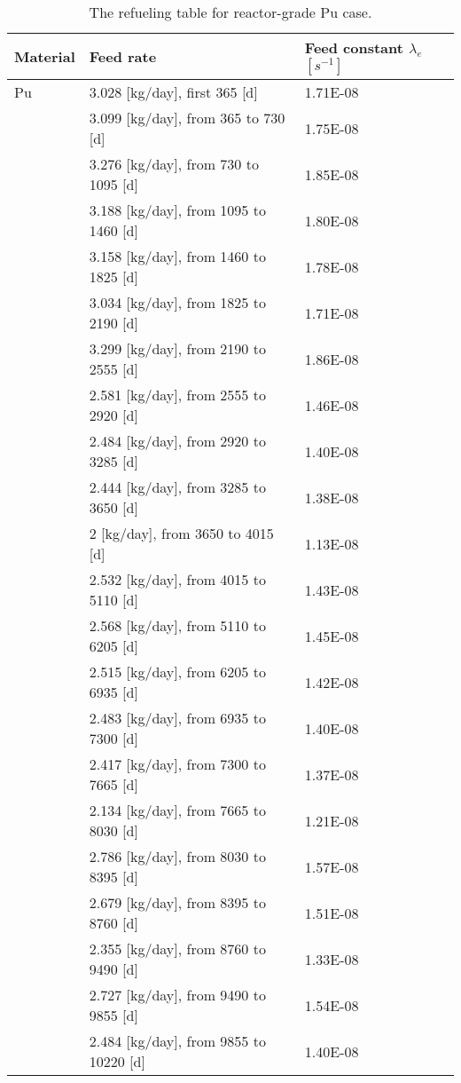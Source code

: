 \newpage
\begin{longtable}{|p{}|p{}|p{}|}
	\caption{The refueling table for reactor-grade Pu case.} 
	\vspace{-0.2in}
	\label{tab:table9}
	\endfirsthead
	\endhead
	\hline
	\textbf{Material} & \textbf{Feed rate} & \textbf{Feed 
		constant} $\lambda_{e}$ $[s^{-1}]$ \\
	\hline
	Pu        &  3.028 [kg/day], first 365 [d] & 1.71E-08 \\
	&  3.099 [kg/day], from 365 to 730 [d] & 		1.75E-08 \\
	&  3.276 [kg/day], from 730 to 1095 [d] & 		1.85E-08 \\
	&  3.188 [kg/day], from 1095 to 1460 [d]& 		1.80E-08	\\
	&  3.158 [kg/day], from 1460 to 1825 [d] &		1.78E-08	\\
	& 3.034 [kg/day], from 1825 to 2190 [d] &		1.71E-08	\\
	& 3.299   [kg/day], from 2190 to 2555 [d] &	1.86E-08	\\
	&  2.581  [kg/day], from 2555 to 2920 [d]&		1.46E-08		\\
	&  2.484  [kg/day], from 2920 to 3285 [d]&		1.40E-08	 \\ 
	&  2.444  [kg/day], from 3285 to 3650 [d]&		1.38E-08	 \\ 
	&   2 [kg/day], from 3650 to 4015 [d]&		1.13E-08	 \\ 
	&  2.532  [kg/day], from 4015 to 5110 [d]&		1.43E-08	 \\
	&  2.568  [kg/day], from 5110 to 6205 [d]&		1.45E-08	 \\
	&  2.515  [kg/day], from 6205 to 6935 [d]&		1.42E-08	 \\
	& 2.483 [kg/day], from 6935 to 7300 [d]&		1.40E-08	 \\
	&  2.417  [kg/day], from 7300 to 7665 [d]&		1.37E-08	 \\
	&  2.134  [kg/day], from 7665 to 8030 [d]&		1.21E-08	 \\
	&  2.786  [kg/day], from 8030 to 8395 [d]&		1.57E-08	 \\
	&   2.679 [kg/day], from 8395 to 8760 [d]&		1.51E-08	 \\
	&  2.355   [kg/day], from 8760 to 9490 [d]&		1.33E-08	 \\
	&  2.727  [kg/day], from 9490 to 9855 [d]&		1.54E-08	 \\
	&  2.484  [kg/day], from 9855 to 10220 [d]&		1.40E-08	 \\

\end{longtable}
